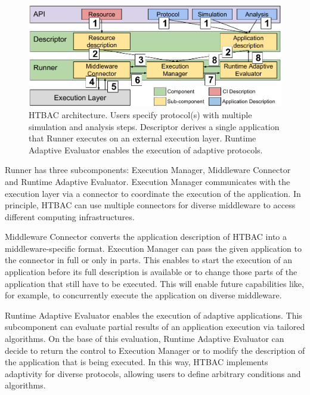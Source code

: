 \begin{figure}
  \centering
  \includegraphics[width=\columnwidth]{figures/HTBAC_architecture_model.pdf}
  \caption{HTBAC architecture. Users specify protocol(s) with multiple
  simulation and analysis steps. Descriptor derives a single application that
  Runner executes on an external execution layer. Runtime Adaptive Evaluator
  enables the execution of adaptive protocols.}\label{fig:architecture}
\up{}
\up{}
\end{figure}

Runner has three subcomponents: Execution Manager, Middleware Connector and
Runtime Adaptive Evaluator. Execution Manager communicates with the
execution layer via a connector to coordinate the execution of the
application. In principle, HTBAC can use multiple connectors for diverse
middleware to access different computing infrastructures.



Middleware Connector converts the application description of HTBAC into a
middleware-specific format. Execution Manager can pass the given application
to the connector in full or only in parts. This enables to start the
execution of an application before its full description is available or to
change those parts of the application that still have to be executed. This
will enable future capabilities like, for example, to concurrently execute
the application on diverse middleware.

Runtime Adaptive Evaluator enables the execution of adaptive applications.
This subcomponent can evaluate partial results of an application execution
via tailored algorithms. On the base of this evaluation, Runtime Adaptive
Evaluator can decide to return the control to Execution Manager or to modify
the description of the application that is being executed. In this way, HTBAC
implements adaptivity for diverse protocols, allowing users to define
arbitrary conditions and algorithms.

